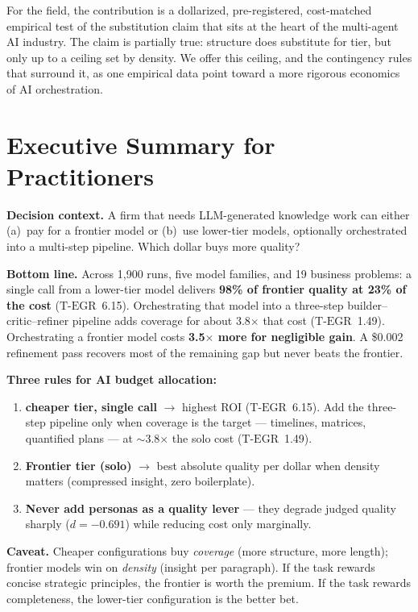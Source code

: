 \documentclass[12pt,a4paper]{article}
\newcommand{\TEGR}{\ensuremath{\text{T-EGR}}}
\begin{document}
For the field, the contribution is a dollarized, pre-registered, cost-matched
empirical test of the substitution claim that sits at the heart of the
multi-agent AI industry. The claim is partially true: structure does substitute
for tier, but only up to a ceiling set by density. We offer this ceiling, and
the contingency rules that surround it, as one empirical data point toward a
more rigorous economics of AI orchestration.

\clearpage
\appendix

\section{Executive Summary for Practitioners}\label{sec:exec-summary}

\begin{mdframed}[style=execsummary]
\noindent\textbf{Decision context.} A firm that needs LLM-generated knowledge
work can either (a)~pay for a frontier model or (b)~use lower-tier models,
optionally orchestrated into a multi-step pipeline. Which dollar buys more
quality?

\medskip
\noindent\textbf{Bottom line.} Across 1{,}900 runs, five model families, and 19
business problems: a single call from a lower-tier model delivers
\textbf{98\% of frontier quality at 23\% of the cost} ($\TEGR$~6.15).
Orchestrating that model into a three-step builder--critic--refiner pipeline
adds coverage for about 3.8$\times$ that cost ($\TEGR$~1.49). Orchestrating a
frontier model costs \textbf{3.5$\times$ more for negligible gain}. A \$0.002
refinement pass recovers most of the remaining gap but never beats the
frontier.

\medskip
\noindent\textbf{Three rules for AI budget allocation:}
\begin{enumerate}[leftmargin=*,nosep]
  \item \textbf{cheaper tier, single call} $\to$ highest ROI
    ($\TEGR$~6.15). Add the three-step pipeline only when coverage is the
    target --- timelines, matrices, quantified plans --- at $\sim$3.8$\times$
    the solo cost ($\TEGR$~1.49).
  \item \textbf{Frontier tier (solo)} $\to$ best absolute quality per dollar
    when density matters (compressed insight, zero boilerplate).
  \item \textbf{Never add personas as a quality lever} --- they degrade judged
    quality sharply ($d = -0.691$) while reducing cost only marginally.
\end{enumerate}

\medskip
\noindent\textbf{Caveat.} Cheaper configurations buy \emph{coverage} (more
structure, more length); frontier models win on \emph{density} (insight per
paragraph). If the task rewards concise strategic principles, the frontier is
worth the premium. If the task rewards completeness, the lower-tier
configuration is the better bet.
\end{mdframed}
\end{document}
